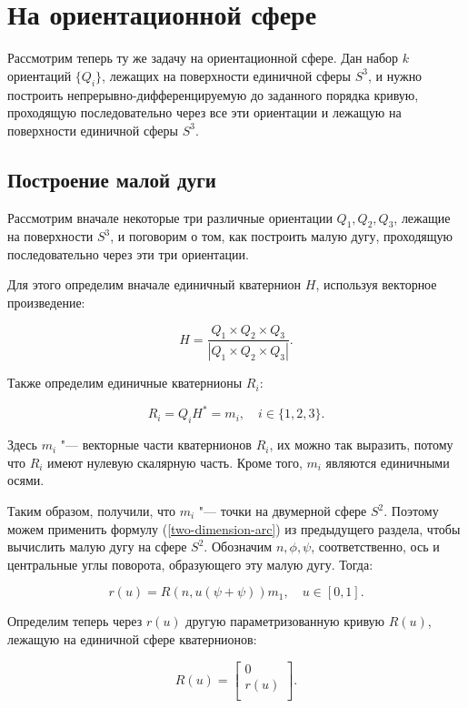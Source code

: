 \section{На ориентационной сфере}

Рассмотрим теперь ту же задачу на ориентационной сфере. Дан набор $k$ ориентаций $\{Q_i\}$, лежащих на поверхности
единичной сферы $S^3$, и нужно построить непрерывно-дифференцируемую до заданного порядка кривую, проходящую
последовательно через все эти ориентации и лежащую на поверхности единичной сферы $S^3$.

\subsection*{Построение малой дуги}

Рассмотрим вначале некоторые три различные ориентации $Q_1, Q_2, Q_3$, лежащие на поверхности $S^3$, и поговорим о
том, как построить малую дугу, проходящую последовательно через эти три ориентации.

Для этого определим вначале единичный кватернион $H$, используя векторное произведение:

\begin{equation}
H=\frac{Q_1 \times Q_2 \times Q_3}{|Q_1 \times Q_2 \times Q_3|}.
\label{orientation-axis}
\end{equation}

Также определим единичные кватернионы $R_i$:

$$
R_i=Q_iH^*=m_i, \quad i \in \{1,2,3\}.
$$

Здесь $m_i$ "--- векторные части кватернионов $R_i$, их можно так выразить, потому что $R_i$ имеют нулевую скалярную
часть. Кроме того, $m_i$ являются единичными осями.

Таким образом, получили, что $m_i$ "--- точки на двумерной сфере $S^2$. Поэтому можем применить формулу
(\ref{two-dimension-arc}) из предыдущего раздела, чтобы вычислить малую дугу на сфере $S^2$. Обозначим $n, \phi, \psi$,
соответственно, ось и центральные углы поворота, образующего эту малую дугу. Тогда:

$$
r(u)=R(n,u(\psi+\psi))m_1, \quad u \in [0,1].
$$

Определим теперь через $r(u)$ другую параметризованную кривую $R(u)$, лежащую на единичной сфере кватернионов:

\begin{equation*}
R(u)=
\left[ {\begin{array}{c}
  0 \\
  r(u) \\
\end{array} } \right].
\end{equation*}

